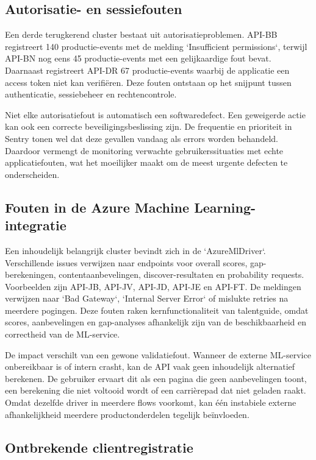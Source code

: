 \subsection{Autorisatie- en sessiefouten}

Een derde terugkerend cluster bestaat uit autorisatieproblemen. API-BB registreert 140 productie-events met de melding `Insufficient permissions`, terwijl API-BN nog eens 45 productie-events met een gelijkaardige fout bevat. Daarnaast registreert API-DR 67 productie-events waarbij de applicatie een access token niet kan verifiëren. Deze fouten ontstaan op het snijpunt tussen authenticatie, sessiebeheer en rechtencontrole.

Niet elke autorisatiefout is automatisch een softwaredefect. Een geweigerde actie kan ook een correcte beveiligingsbeslissing zijn. De frequentie en prioriteit in Sentry tonen wel dat deze gevallen vandaag als errors worden behandeld. Daardoor vermengt de monitoring verwachte gebruikerssituaties met echte applicatiefouten, wat het moeilijker maakt om de meest urgente defecten te onderscheiden.

\subsection{Fouten in de Azure Machine Learning-integratie}

Een inhoudelijk belangrijk cluster bevindt zich in de `AzureMlDriver`. Verschillende issues verwijzen naar endpoints voor overall scores, gap-berekeningen, contentaanbevelingen, discover-resultaten en probability requests. Voorbeelden zijn API-JB, API-JV, API-JD, API-JE en API-FT. De meldingen verwijzen naar `Bad Gateway`, `Internal Server Error` of mislukte retries na meerdere pogingen. Deze fouten raken kernfunctionaliteit van talentguide, omdat scores, aanbevelingen en gap-analyses afhankelijk zijn van de beschikbaarheid en correctheid van de ML-service.

De impact verschilt van een gewone validatiefout. Wanneer de externe ML-service onbereikbaar is of intern crasht, kan de API vaak geen inhoudelijk alternatief berekenen. De gebruiker ervaart dit als een pagina die geen aanbevelingen toont, een berekening die niet voltooid wordt of een carrièrepad dat niet geladen raakt. Omdat dezelfde driver in meerdere flows voorkomt, kan één instabiele externe afhankelijkheid meerdere productonderdelen tegelijk beïnvloeden.

\subsection{Ontbrekende clientregistratie}

